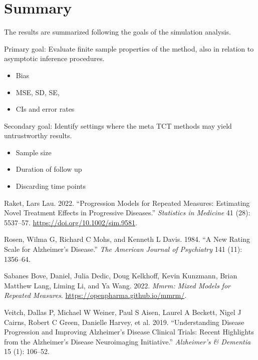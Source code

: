 \documentclass[
]{article}
\providecommand{\tightlist}{%
  \setlength{\itemsep}{0pt}\setlength{\parskip}{0pt}}
\newlength{\cslhangindent}
\newlength{\cslentryspacingunit} %
\newenvironment{CSLReferences}[2] %
 {%
  \setlength{\parindent}{0pt}
  \ifodd #1
  \let\oldpar\par
  \def\par{\hangindent=\cslhangindent\oldpar}
  \fi
  \setlength{\parskip}{#2\cslentryspacingunit}
 }%
 {}
\begin{document}
\hypertarget{summary}{%
\section{Summary}\label{summary}}

The results are summarized following the goals of the simulation analysis.

Primary goal: Evaluate finite sample properties of the method, also in relation
to asymptotic inference procedures.

\begin{itemize}
\tightlist
\item
  Bias
\item
  MSE, SD, SE,
\item
  CIs and error rates
\end{itemize}

Secondary goal: Identify settings where the meta TCT methods may yield
untrustworthy results.

\begin{itemize}
\tightlist
\item
  Sample size
\item
  Duration of follow up
\item
  Discarding time points
\end{itemize}

\hypertarget{refs}{}
\begin{CSLReferences}{1}{0}
\leavevmode{}%
Raket, Lars Lau. 2022. {``Progression Models for Repeated Measures: {Estimating} Novel Treatment Effects in Progressive Diseases.''} \emph{Statistics in Medicine} 41 (28): 5537--57. \url{https://doi.org/10.1002/sim.9581}.

\leavevmode{}%
Rosen, Wilma G, Richard C Mohs, and Kenneth L Davis. 1984. {``A New Rating Scale for Alzheimer's Disease.''} \emph{The American Journal of Psychiatry} 141 (11): 1356--64.

\leavevmode{}%
Sabanes Bove, Daniel, Julia Dedic, Doug Kelkhoff, Kevin Kunzmann, Brian Matthew Lang, Liming Li, and Ya Wang. 2022. \emph{Mmrm: Mixed Models for Repeated Measures}. \url{https://openpharma.github.io/mmrm/}.

\leavevmode{}%
Veitch, Dallas P, Michael W Weiner, Paul S Aisen, Laurel A Beckett, Nigel J Cairns, Robert C Green, Danielle Harvey, et al. 2019. {``Understanding Disease Progression and Improving Alzheimer's Disease Clinical Trials: Recent Highlights from the Alzheimer's Disease Neuroimaging Initiative.''} \emph{Alzheimer's \& Dementia} 15 (1): 106--52.

\end{CSLReferences}
\end{document}
